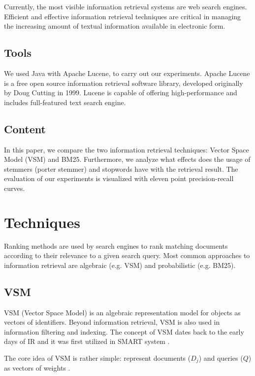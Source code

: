Currently, the most visible information retrieval systems are web search engines. Efficient and effective information retrieval techniques are critical in managing the increasing amount of textual information available in electronic form. 

\subsection{Tools}

We used Java with Apache Lucene, to carry out our experiments. Apache Lucene is a free open source information retrieval software library, developed originally by Doug Cutting in 1999.  Lucene is capable of offering high-performance and includes full-featured text search engine.

\subsection{Content}

In this paper, we compare the two information retrieval techniques: Vector Space Model (VSM) and BM25. Furthermore, we analyze what effects does the usage of stemmers (porter stemmer) and stopwords have with the retrieval result. The evaluation of our experiments is visualized with eleven point precision-recall curves. 



\section{Techniques}

Ranking methods are used by search engines to rank matching documents according to their relevance to a given search query. Most common approaches to information retrieval are algebraic (e.g. VSM) and probabilistic (e.g. BM25).

\subsection{VSM}

VSM (Vector Space Model) is an algebraic representation model for objects as vectors of identifiers. Beyond information retrieval, VSM is also used in information filtering and indexing. The concept of VSM dates back to the early days of IR and it was first utilized in SMART system \citep{dubin2004most}.

The core idea of VSM is rather simple: represent documents ($D_j$) and queries ($Q$) as vectors of weights \citep{Salton:1975:VSM:361219.361220}.

